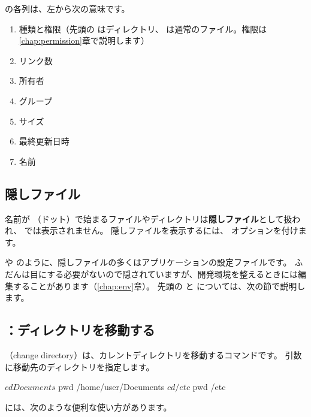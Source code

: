  の各列は、左から次の意味です。

\begin{enumerate}
  \item 種類と権限（先頭の  はディレクトリ、\cmd{-} は通常のファイル。権限は\ref{chap:permission}章で説明します）
  \item リンク数
  \item 所有者
  \item グループ
  \item サイズ
  \item 最終更新日時
  \item 名前
\end{enumerate}

\subsection{隠しファイル}

名前が （ドット）で始まるファイルやディレクトリは\textbf{隠しファイル}として扱われ、 では表示されません。
隠しファイルを表示するには、 オプションを付けます。


 や  のように、隠しファイルの多くはアプリケーションの設定ファイルです。
ふだんは目にする必要がないので隠されていますが、開発環境を整えるときには編集することがあります（\ref{chap:env}章）。
先頭の  と  については、次の節で説明します。

\subsection{：ディレクトリを移動する}

（change directory）は、カレントディレクトリを移動するコマンドです。
引数に移動先のディレクトリを指定します。

\begin{terminal}[ディレクトリを移動する]
$ cd Documents
$ pwd
/home/user/Documents
$ cd /etc
$ pwd
/etc
\end{terminal}

 には、次のような便利な使い方があります。

